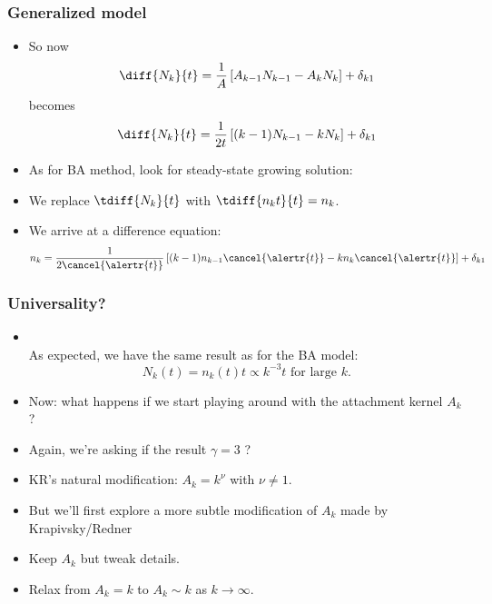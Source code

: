 \begin{frame}[label=]
  \frametitle{Generalized model}  

  \begin{block}{}
  \begin{itemize}
  \item<1->
    So now
    $$
    \diff{N_k}{t}
    =
    \frac{1}{A}
    \left[
      A_{k-1} N_{k-1} - A_{k} N_{k}
    \right]
    + \delta_{k1}
    $$
    becomes
    $$
    \diff{N_k}{t}
    =
    \frac{1}{2t}
    \left[
      (k-1) N_{k-1} - k N_{k}
    \right]
    + \delta_{k1}
    $$
  \item<2->
    As for BA method, look for steady-state growing solution:
  \item<4->
    We replace $\tdiff{N_k}{t}$ with $\tdiff{n_k t}{t} = n_k$.
  \item<5->
    We arrive at a difference equation:
    $$
    n_k
    =
    \frac{1}{2\cancel{\alertr{t}}}
    \left[
      (k-1) n_{k-1}\cancel{\alertr{t}} - k n_{k}\cancel{\alertr{t}}
    \right]
    + \delta_{k1}
    $$
  \end{itemize}
  \end{block}

\end{frame}



\begin{frame}
  \frametitle{Universality?}

  \begin{block}{}
  \begin{itemize}
  \item<1->
    \\
    As expected, we have the same result as for the BA model:
    $$
    N_k(t) = n_k(t) t \propto k^{-3} t \mbox{\ for large $k$}.
    $$
  \item<2->
    Now: what happens if we start playing around with 
    the attachment kernel $A_k$?
  \item<3->
    Again, we're asking if the result $\gamma=3$
    ?
  \item<4->
    KR's natural modification: $A_k = k^\nu$ with $\nu \ne 1$.
  \item<5->
    But we'll first explore a more subtle modification of $A_k$ made by Krapivsky/Redner\cite{krapivsky2001a}
  \item<6->
    Keep $A_k$  but tweak details.
  \item<7->
     Relax from $A_k = k$ to $A_k \sim k$ as $k \rightarrow \infty$.
  \end{itemize}
  \end{block}

\end{frame}

